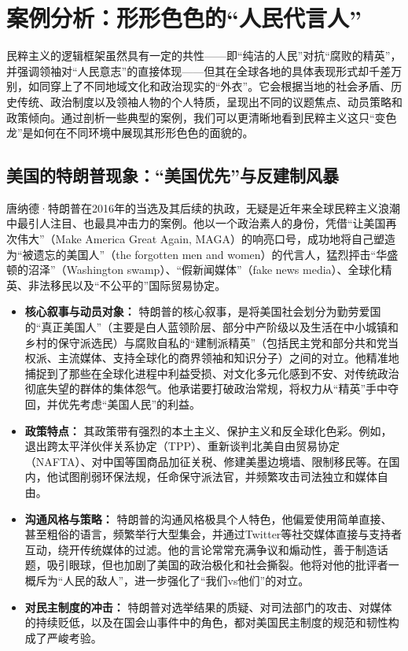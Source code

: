 \documentclass[UTF8, 10pt]{ctexbook}
\begin{document}
\section{案例分析：形形色色的“人民代言人”}
\lettrine[lines=2]{民}{粹主义}的逻辑框架虽然具有一定的共性——即“纯洁的人民”对抗“腐败的精英”，并强调领袖对“人民意志”的直接体现——但其在全球各地的具体表现形式却千差万别，如同穿上了不同地域文化和政治现实的“外衣”。它会根据当地的社会矛盾、历史传统、政治制度以及领袖人物的个人特质，呈现出不同的议题焦点、动员策略和政策倾向。通过剖析一些典型的案例，我们可以更清晰地看到民粹主义这只“变色龙”是如何在不同环境中展现其形形色色的面貌的。

\subsection{美国的特朗普现象：“美国优先”与反建制风暴}
唐纳德·特朗普在2016年的当选及其后续的执政，无疑是近年来全球民粹主义浪潮中最引人注目、也最具冲击力的案例。他以一个政治素人的身份，凭借“让美国再次伟大”（Make America Great Again, MAGA）的响亮口号，成功地将自己塑造为“被遗忘的美国人”（the forgotten men and women）的代言人，猛烈抨击“华盛顿的沼泽”（Washington swamp）、“假新闻媒体”（fake news media）、全球化精英、非法移民以及“不公平的”国际贸易协定。
\begin{itemize}
    \item \textbf{核心叙事与动员对象：} 特朗普的核心叙事，是将美国社会划分为勤劳爱国的“真正美国人”（主要是白人蓝领阶层、部分中产阶级以及生活在中小城镇和乡村的保守派选民）与腐败自私的“建制派精英”（包括民主党和部分共和党当权派、主流媒体、支持全球化的商界领袖和知识分子）之间的对立。他精准地捕捉到了那些在全球化进程中利益受损、对文化多元化感到不安、对传统政治彻底失望的群体的集体怨气。他承诺要打破政治常规，将权力从“精英”手中夺回，并优先考虑“美国人民”的利益。
    \item \textbf{政策特点：} 其政策带有强烈的本土主义、保护主义和反全球化色彩。例如，退出跨太平洋伙伴关系协定（TPP）、重新谈判北美自由贸易协定（NAFTA）、对中国等国商品加征关税、修建美墨边境墙、限制移民等。在国内，他试图削弱环保法规，任命保守派法官，并频繁攻击司法独立和媒体自由。
    \item \textbf{沟通风格与策略：} 特朗普的沟通风格极具个人特色，他偏爱使用简单直接、甚至粗俗的语言，频繁举行大型集会，并通过Twitter等社交媒体直接与支持者互动，绕开传统媒体的过滤。他的言论常常充满争议和煽动性，善于制造话题，吸引眼球，但也加剧了美国的政治极化和社会撕裂。他将对他的批评者一概斥为“人民的敌人”，进一步强化了“我们vs他们”的对立。
    \item \textbf{对民主制度的冲击：} 特朗普对选举结果的质疑、对司法部门的攻击、对媒体的持续贬低，以及在国会山事件中的角色，都对美国民主制度的规范和韧性构成了严峻考验。
\end{itemize}
\end{document}
